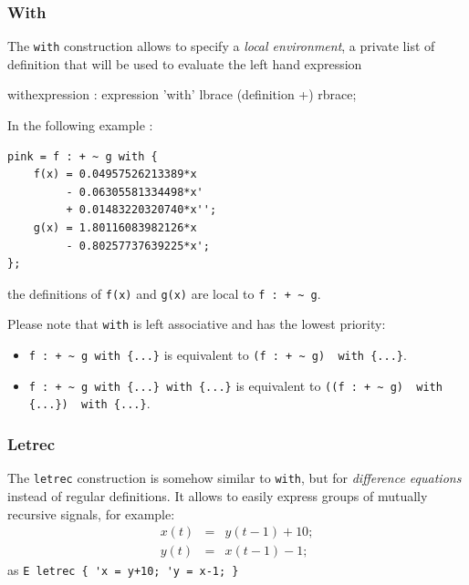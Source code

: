 \subsubsection{With} 
The \lstinline'with' construction allows to specify a \textit{local environment}, a private list of definition that will be used to evaluate the left hand expression


\begin{rail}
withexpression : expression 'with' lbrace (definition +) rbrace;
\end{rail}


In the following example :
\begin{lstlisting}
pink = f : + ~ g with {
	f(x) = 0.04957526213389*x 
		 - 0.06305581334498*x' 
         + 0.01483220320740*x'';
	g(x) = 1.80116083982126*x 
		 - 0.80257737639225*x';
};
\end{lstlisting}
the definitions of \lstinline'f(x)' and \lstinline'g(x)' are local to \lstinline'f : + ~ g'.

Please note that \lstinline'with' is left associative and has the lowest priority:
\begin{itemize} 
\item[-] \lstinline'f : + ~ g with {...}' is equivalent to \lstinline'(f : + ~ g)  with {...}'. 
\item[-] \lstinline'f : + ~ g with {...} with {...}' is equivalent to \lstinline'((f : + ~ g)  with {...})  with {...}'. 
\end{itemize}

\subsubsection{Letrec} 
The \lstinline'letrec' construction is somehow similar to \lstinline'with', but for   \emph{difference equations} instead of regular definitions. It allows to easily express groups of mutually recursive signals, for example:
\begin{eqnarray*}
x(t)&=&y(t-1)+10;\\
y(t)&=&x(t-1)-1;
\end{eqnarray*}
as \lstinline|E letrec { 'x = y+10; 'y = x-1; }|	

